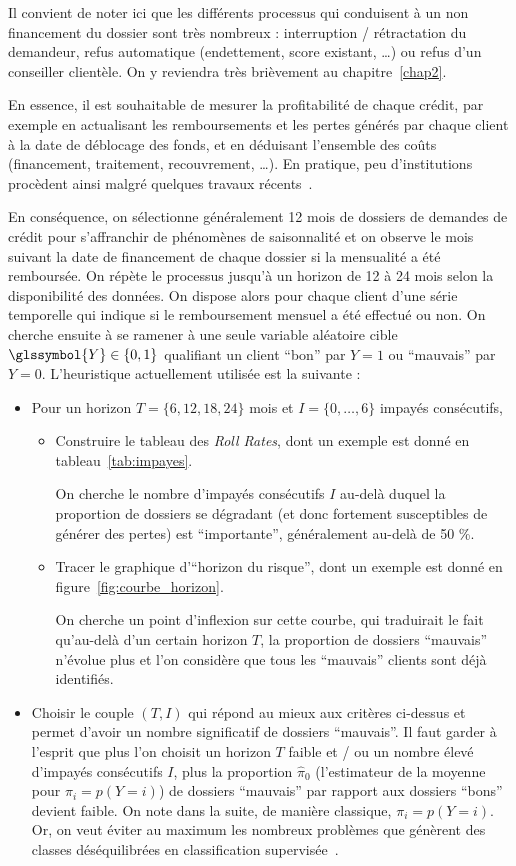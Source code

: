 Il convient de noter ici que les différents processus qui conduisent à un non financement du dossier sont très nombreux : interruption / rétractation du demandeur, refus automatique (endettement, \gls{score} existant, \dots) ou refus d'un conseiller clientèle. On y reviendra très brièvement au chapitre~\ref{chap2}.

En essence, il est souhaitable de mesurer la profitabilité de chaque crédit, par exemple en actualisant les remboursements et les pertes générés par chaque client à la date de déblocage des fonds, et en déduisant l'ensemble des coûts (financement, traitement, recouvrement, \dots). En pratique, peu d'institutions procèdent ainsi malgré quelques travaux récents~\cite{finlay2010credit}.

En conséquence, on sélectionne généralement 12 mois de dossiers de demandes de crédit pour s'affranchir de phénomènes de saisonnalité et on observe le mois suivant la date de financement de chaque dossier si la mensualité a été remboursée. On répète le processus jusqu'à un horizon de 12 à 24 mois selon la disponibilité des données. On dispose alors pour chaque client d'une série temporelle qui indique si le remboursement mensuel a été effectué ou non. On cherche ensuite à se ramener à une seule variable aléatoire cible $\glssymbol{Y} \in \{0,1\}$ qualifiant un client ``bon'' par $Y=1$ ou ``mauvais'' par $Y=0$. L'heuristique actuellement utilisée est la suivante :
\begin{itemize}
\item Pour un horizon $T=\{6,12,18,24\}$ mois et $I = \{0,\dots,6\}$ impayés consécutifs,
\begin{itemize}
\item Construire le tableau des \textit{Roll Rates}, dont un exemple est donné en tableau~\ref{tab:impayes}.

On cherche le nombre d'impayés consécutifs $I$ au-delà duquel la proportion de dossiers se dégradant (et donc fortement susceptibles de générer des pertes) est ``importante'', généralement au-delà de 50 \%. 
\item Tracer le graphique d'``horizon du risque'', dont un exemple est donné en figure~\ref{fig:courbe_horizon}.

On cherche un point d'inflexion sur cette courbe, qui traduirait le fait qu'au-delà d'un certain horizon $T$, la proportion de dossiers ``mauvais'' n'évolue plus et l'on considère que tous les ``mauvais'' clients sont déjà identifiés.
\end{itemize}
\item Choisir le couple $(T,I)$ qui répond au mieux aux critères ci-dessus et permet d'avoir un nombre significatif de dossiers ``mauvais''. Il faut garder à l'esprit que plus l'on choisit un horizon $T$ faible et / ou un nombre élevé d'impayés consécutifs $I$, plus la proportion $\hat{\pi}_0$ (l'estimateur de la moyenne pour $\pi_i = p(Y=i)$) de dossiers ``mauvais'' par rapport aux dossiers ``bons'' devient faible. On note dans la suite, de manière classique, $\pi_i = p(Y=i)$. Or, on veut éviter au maximum les nombreux problèmes que génèrent des classes déséquilibrées en classification supervisée~\cite{sun2009classification}.
\end{itemize}

